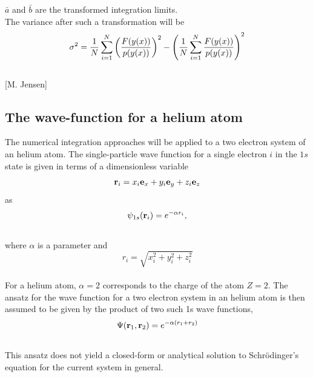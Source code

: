 \documentclass[%
reprint,nofootinbib,
amsmath,amssymb,
aps,
]{revtex4-1}
\begin{document}
$\bar{a}$ and $\bar{b}$ are the transformed integration limits. \\
The variance after such a transformation will be \vspace{2mm} \\
\begin{equation}\label{mcise}
	\sigma^2 = \dfrac{1}{N}\sum_{i = 1}^{N}\qty(\dfrac{F(y(x))}{p(y(x))})^2 -\qty(\dfrac{1}{N}\sum_{i = 1}^{N}\dfrac{F(y(x))}{p(y(x))})^2
\end{equation}\\

\hspace{60mm}[M. Jensen]
\subsection*{The wave-function for a helium atom} \noindent 
The numerical integration approaches will be applied to a two electron system of an helium atom. The single-particle wave function for a single electron $i$ in the $1s$ state is given in terms of a dimensionless variable 
\begin{equation*}
	 {\bf r}_i =  x_i {\bf e}_x + y_i {\bf e}_y +z_i {\bf e}_z 
\end{equation*}
as 
\begin{equation*}
	\psi_{1s}({\bf r}_i)  =   e^{-\alpha r_i},
\end{equation*}\vspace{1mm} \\
where $\alpha$ is a parameter and \vspace{1mm} \\
\begin{equation*}
	r_i = \sqrt{x_i^2+y_i^2+z_i^2}
\end{equation*}\vspace{2mm} \\
For a helium atom, $\alpha = 2$ corresponds to the charge of the atom $Z = 2$. The ansatz for the wave function for a two electron system in an helium atom is then assumed to be given by the product of two such 1s wave functions,  \\
\begin{equation}\label{waveequation}
	\Psi({\bf r}_1,{\bf r}_2)  =   e^{-\alpha (r_1+r_2)}
\end{equation}\vspace{2mm} \\
This ansatz does not yield a closed-form or analytical solution to Schrödinger's equation for the current system in general. \\ \indent 
\end{document}
